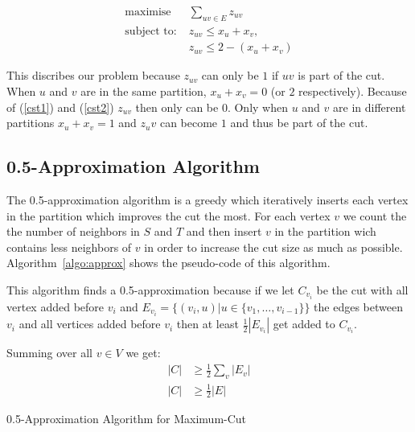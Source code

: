 \documentclass[twocolumn]{article}
\begin{document}
\begin{align}
  \text{maximise} \; & \sum_{uv \in E} z_{uv} \\
  \text{subject to:} \; & z_{uv} \leq x_u + x_v, \label{cst1} \\
  & z_{uv} \leq 2 - (x_u + x_v) \label{cst2}
\end{align}

This discribes our problem because $z_{uv}$ can only be $1$ if $uv$ is part of the cut. 
When $u$ and $v$ are in the same partition, $x_u + x_v = 0$ (or $2$ respectively).
Because of (\ref{cst1}) and (\ref{cst2}) $z_{uv}$ then only can be $0$.
Only when $u$ and $v$ are in different partitions $x_u + x_v = 1$ and $z_uv$ can become
$1$ and thus be part of the cut.

\subsection{0.5-Approximation Algorithm}

The 0.5-approximation algorithm is a greedy which iteratively inserts each vertex in the partition
which improves the cut the most. For each vertex $v$ we count the the number of neighbors in
$S$ and $T$ and then insert $v$ in the partition wich contains less neighbors of $v$ in order
to increase the cut size as much as possible. Algorithm~\ref{algo:approx} shows the pseudo-code
of this algorithm.

This algorithm finds a 0.5-approximation because if we let $C_{v_i}$ be the cut with all vertex added
before $v_i$ and $E_{v_i} = \{(v_i, u) | u \in \{v_1, \dots, v_{i -1}\}\}$ the edges between $v_i$
and all vertices added before $v_i$ then at least $\frac{1}{2}|E_{v_i}|$ get added to $C_{v_i}$.

Summing over all $v \in V$ we get:
\begin{align*}
  |C| & \geq \frac{1}{2} \sum_{v} |E_v| \\
  |C| & \geq \frac{1}{2} |E|
\end{align*}




\begin{algorithm}
  \caption{0.5-Approximation Algorithm for Maximum-Cut}
  \label{alg:approx}
\end{algorithm}
\end{document}
